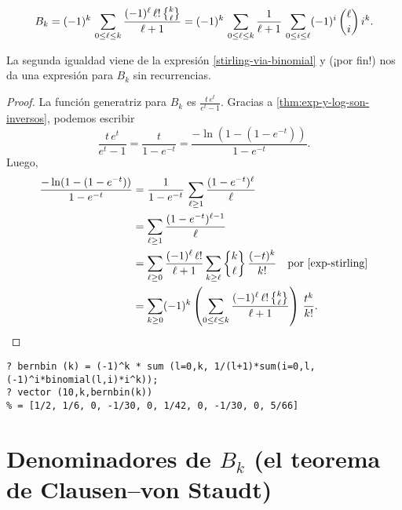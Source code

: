 \documentclass{article}
\numberwithin{equation}{section}
\theoremstyle{definition}
\begin{document}
\begin{teorema}
  \[ B_k = (-1)^k \, \sum_{0 \le \ell \le k} \frac{(-1)^\ell \, \ell! \, \Stirling{k}{\ell}}{\ell+1} =
    (-1)^k \, \sum_{0 \le \ell \le k} \frac{1}{\ell+1}\,\sum_{0 \le i \le \ell} (-1)^i \, {\ell \choose i} \, i^k. \]
\end{teorema}

La segunda igualdad viene de la expresión \ref{stirling-via-binomial}
y (¡por fin!) nos da una expresión para $B_k$ sin recurrencias.

\begin{proof}
  La función generatriz para $B_k$ es $\frac{t\,e^t}{e^t - 1}$. Gracias a
  \ref{thm:exp-y-log-son-inversos}, podemos escribir
  $$\frac{t\,e^t}{e^t - 1} = \frac{t}{1 - e^{-t}} = \frac{-\ln (1 - (1-e^{-t}))}{1 - e^{-t}}.$$
  Luego,
  \begin{align*}
    \frac{-\ln (1 - (1-e^{-t}))}{1 - e^{-t}} & = \frac{1}{1 - e^{-t}}\,\sum_{\ell \ge 1} \frac{(1 - e^{-t})^\ell}{\ell} \\
                                             & = \sum_{\ell \ge 1} \frac{(1 - e^{-t})^{\ell-1}}{\ell} \\
                                             & = \sum_{\ell \ge 0} \frac{(-1)^\ell\,\ell!}{\ell+1} \sum_{k \ge \ell} \Stirling{k}{\ell}\,\frac{(-t)^k}{k!} \quad\text{por \ref{exp-stirling}} \\
                                             & = \sum_{k \ge 0} (-1)^k \left(\sum_{0\le \ell \le k} \frac{(-1)^\ell\,\ell! \, \Stirling{k}{\ell}}{\ell+1}\right)\,\frac{t^k}{k!}.
                                               \qedhere
  \end{align*}
\end{proof}

\begin{shaded}
\small
\begin{verbatim}
? bernbin (k) = (-1)^k * sum (l=0,k, 1/(l+1)*sum(i=0,l, (-1)^i*binomial(l,i)*i^k));
? vector (10,k,bernbin(k))                                                         
% = [1/2, 1/6, 0, -1/30, 0, 1/42, 0, -1/30, 0, 5/66]
\end{verbatim}
\end{shaded}


\section{Denominadores de $B_k$ (el teorema de Clausen--von Staudt)}
\label{section:teorema-de-von-Staudt}
\end{document}
